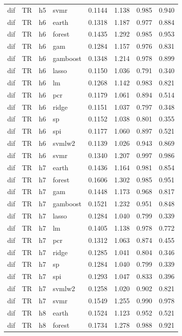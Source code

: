 \begin{ThreePartTable}
\begin{longtable}[t]{llclcccc}
dif & TR & h5 & svmr & 0.1144 & 1.138 & 0.985 & 0.940\\
\addlinespace
dif & TR & h6 & earth & 0.1318 & 1.187 & 0.977 & 0.884\\
dif & TR & h6 & forest & 0.1435 & 1.292 & 0.985 & 0.953\\
dif & TR & h6 & gam & 0.1284 & 1.157 & 0.976 & 0.831\\
dif & TR & h6 & gamboost & 0.1348 & 1.214 & 0.978 & 0.899\\
dif & TR & h6 & lasso & 0.1150 & 1.036 & 0.791 & 0.340\\
dif & TR & h6 & lm & 0.1268 & 1.142 & 0.983 & 0.821\\
dif & TR & h6 & pcr & 0.1179 & 1.061 & 0.894 & 0.514\\
dif & TR & h6 & ridge & 0.1151 & 1.037 & 0.797 & 0.348\\
dif & TR & h6 & sp & 0.1152 & 1.038 & 0.801 & 0.355\\
dif & TR & h6 & spi & 0.1177 & 1.060 & 0.897 & 0.521\\
dif & TR & h6 & svmlw2 & 0.1139 & 1.026 & 0.943 & 0.869\\
dif & TR & h6 & svmr & 0.1340 & 1.207 & 0.997 & 0.986\\
\addlinespace
dif & TR & h7 & earth & 0.1436 & 1.164 & 0.981 & 0.854\\
dif & TR & h7 & forest & 0.1606 & 1.302 & 0.985 & 0.951\\
dif & TR & h7 & gam & 0.1448 & 1.173 & 0.968 & 0.817\\
dif & TR & h7 & gamboost & 0.1521 & 1.232 & 0.951 & 0.848\\
dif & TR & h7 & lasso & 0.1284 & 1.040 & 0.799 & 0.339\\
dif & TR & h7 & lm & 0.1405 & 1.138 & 0.978 & 0.772\\
dif & TR & h7 & pcr & 0.1312 & 1.063 & 0.874 & 0.455\\
dif & TR & h7 & ridge & 0.1285 & 1.041 & 0.804 & 0.346\\
dif & TR & h7 & sp & 0.1284 & 1.040 & 0.799 & 0.339\\
dif & TR & h7 & spi & 0.1293 & 1.047 & 0.833 & 0.396\\
dif & TR & h7 & svmlw2 & 0.1258 & 1.020 & 0.902 & 0.821\\
dif & TR & h7 & svmr & 0.1549 & 1.255 & 0.990 & 0.978\\
\addlinespace
dif & TR & h8 & earth & 0.1524 & 1.123 & 0.952 & 0.521\\
dif & TR & h8 & forest & 0.1734 & 1.278 & 0.988 & 0.921\\

\end{longtable}
\end{ThreePartTable}
